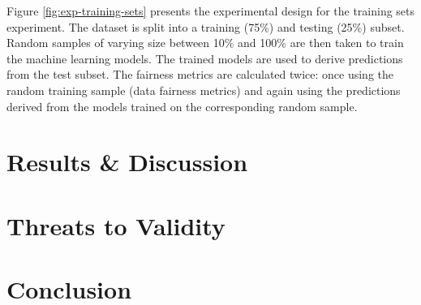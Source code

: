 \documentclass{article}
\begin{document}



Figure \ref{fig:exp-training-sets} presents the experimental design
for the training sets experiment. The dataset is split into a training
(75\%) and testing (25\%) subset. Random samples of varying size
between 10\% and 100\% are then taken to train the machine learning
models. The trained models are used to derive predictions from the
test subset. The fairness metrics are calculated twice: once using the
random training sample (data fairness metrics) and again using the
predictions derived from the models trained on the corresponding
random sample.

\section{Results \& Discussion}\label{sec:results}



\section{Threats to Validity}\label{sec:threats}

\section{Conclusion}\label{sec:conclude}



\end{document}
